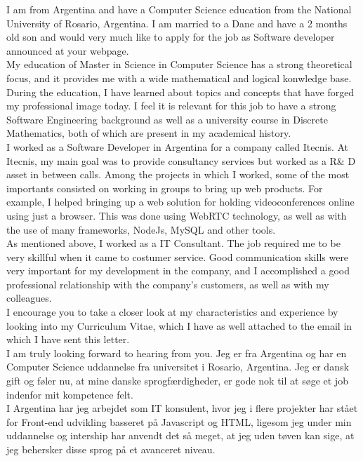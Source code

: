 \documentclass[11pt,a4paper,sans]{moderncv}        %
\begin{document}
\ifenglish
I am from Argentina and have a Computer Science education from the National University of Rosario, Argentina. I am married to a Dane and have a 2 months old son and would very much like to apply for the job as Software developer announced at your webpage.\\
\bigskip
My education of Master in Science in Computer Science has a strong theoretical focus, and it provides me with a wide mathematical and logical konwledge base. During the education, I have learned about topics and concepts that have forged my professional image today. I feel it is relevant for this job to have a strong Software Engineering background as well as a university course in Discrete Mathematics, both of which are present in my academical history.\\ 
\bigskip
I worked as a Software Developer in Argentina for a company called Itecnis. At Itecnis, my main goal was to provide consultancy services but worked as a R\& D asset in between calls. Among the projects in which I worked, some of the most importants consisted on working in groups to bring up web products. For example, I helped bringing up a web solution for holding videoconferences online using just a browser. This was done using WebRTC technology, as well as with the use of many frameworks, NodeJs, MySQL and other tools.\\
\bigskip
As mentioned above, I worked as a IT Consultant. The job required me to be very skillful when it came to costumer service. Good communication skills were very important for my development in the company, and I accomplished a good professional relationship with the company's customers, as well as with my colleagues.\\
\bigskip
I encourage you to take a closer look at my characteristics and experience by looking into my Curriculum Vitae, which I have as well attached to the email in which I have sent this letter.\\
\bigskip
I am truly looking forward to hearing from you.
\else
Jeg er fra Argentina og har en Computer Science uddannelse fra universitet i Rosario, Argentina. Jeg er dansk gift og føler nu, at mine danske sprogfærdigheder, er gode nok til at søge et job indenfor mit kompetence felt.\\

I Argentina har jeg arbejdet som IT konsulent, hvor jeg i flere projekter har stået for Front-end udvikling basseret på Javascript og HTML, ligesom jeg under min uddannelse og intership har anvendt det så meget, at jeg uden tøven kan sige, at jeg behersker disse sprog på et avanceret niveau.\\
\end{document}
